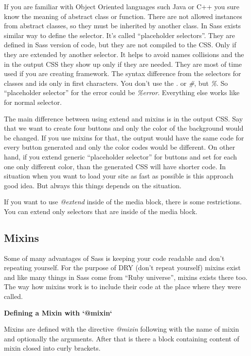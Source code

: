\documentclass[a4paper,12pt,oneside,pdftex]{sphinxmanual}
\begin{document}
If you are familiar with Object Oriented languages such Java or C++ you sure know the meaning of abstract class or function. There are not allowed instances from abstract classes, so they must be inherited by another class. In Sass exists similar way to define the selector. It's called ``placeholder selectors''. They are defined in Sass version of code, but they are not compiled to the CSS. Only if they are extended by another selector. It helps to avoid names collisions and the in the output CSS they show up only if they are needed. They are most of time used if you are creating framework. The syntax difference from the selectors for classes and ids only in first characters. You don't use the \emph{.} or \emph{\#}, but \emph{\%}. So ``placeholder selector'' for the error could be \emph{\%error}. Everything else works like for normal selector.

The main difference between using extend and mixins is in the output CSS. Say that we want to create four buttons and only the color of the background would be changed. If you use mixins for that, the output would have the same code for every button generated and only the color codes would be different. On other hand, if you extend generic ``placeholder selector''  for buttons and set for each one only different color, than the generated CSS will have shorter code. In situation when you want to load your site as fast as possible is this approach good idea. But always this things depends on the situation.

If you want to use \emph{@extend} inside of the media block, there is some restrictions. You can extend only selectors that are inside of the media block.


\subsection{Mixins}
\label{src/sass:mixins}
Some of many advantages of Sass is keeping your code readable and don't repeating yourself. For the purpose of DRY (don't repeat yourself) mixins exist and like many things in Sass come from ``Ruby universe'', mixins exists there too. The way how mixins work is to include their code at the place where they were called.

\textbf{Defining a Mixin with {}`@mixin{}`}

Mixins are defined with the directive \emph{@mixin} following with the name of mixin and optionally the arguments. After that is there a block containing content of mixin closed into curly brackets.
\end{document}
